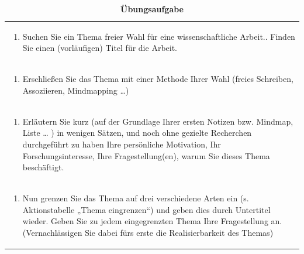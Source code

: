 \documentclass[]{book}
\providecommand{\tightlist}{%
  \setlength{\itemsep}{0pt}\setlength{\parskip}{0pt}}
\theoremstyle{definition}
\theoremstyle{definition}
\theoremstyle{definition}
\theoremstyle{remark}
\begin{document}
\begin{longtable}[]{@{}l@{}}
\caption{\textbf{\label{tab:aufgabe1-test} Übungsaufgabe}}\tabularnewline
\toprule
\begin{minipage}[t]{0.97\columnwidth}\raggedright\strut
\begin{enumerate}
\def\labelenumi{\arabic{enumi}.}
\tightlist
\item
  Suchen Sie ein Thema freier Wahl für eine wissenschaftliche Arbeit..
  Finden Sie einen (vorläufigen) Titel für die Arbeit. \vspace{-6mm}
\end{enumerate}\strut
\end{minipage}\tabularnewline
\begin{minipage}[t]{0.97\columnwidth}\raggedright\strut
\begin{enumerate}
\def\labelenumi{\arabic{enumi}.}
\setcounter{enumi}{1}
\tightlist
\item
  Erschließen Sie das Thema mit einer Methode Ihrer Wahl (freies
  Schreiben, Assoziieren, Mindmapping \ldots{})\vspace{-6mm}
\end{enumerate}\strut
\end{minipage}\tabularnewline
\begin{minipage}[t]{0.97\columnwidth}\raggedright\strut
\begin{enumerate}
\def\labelenumi{\arabic{enumi}.}
\setcounter{enumi}{2}
\tightlist
\item
  Erläutern Sie kurz (auf der Grundlage Ihrer ersten Notizen bzw.
  Mindmap, Liste \ldots{} ) in wenigen Sätzen, und noch ohne gezielte
  Recherchen durchgeführt zu haben Ihre persönliche Motivation, Ihr
  Forschungsinteresse, Ihre Fragestellung(en), warum Sie dieses Thema
  beschäftigt.\vspace{-6mm}
\end{enumerate}\strut
\end{minipage}\tabularnewline
\begin{minipage}[t]{0.97\columnwidth}\raggedright\strut
\begin{enumerate}
\def\labelenumi{\arabic{enumi}.}
\setcounter{enumi}{3}
\tightlist
\item
  Nun grenzen Sie das Thema auf drei verschiedene Arten ein (s.
  Aktionstabelle „Thema eingrenzen``) und geben dies durch Untertitel
  wieder. Geben Sie zu jedem eingegrenzten Thema Ihre Fragestellung an.
  (Vernachlässigen Sie dabei fürs erste die Realisierbarkeit des Themas)
\end{enumerate}\strut
\end{minipage}\tabularnewline
\bottomrule
\end{longtable}
\end{document}

